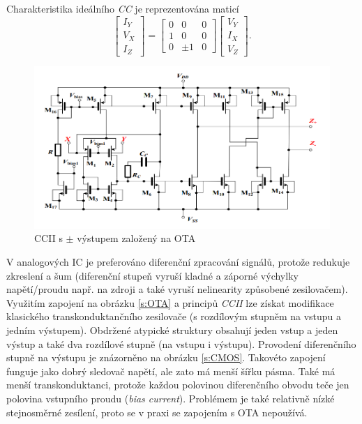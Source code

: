 Charakteristika ideálního \textit{CC} je reprezentována maticí
\begin{equation}
\begin{bmatrix}
I_Y \\ V_X \\ I_Z
\end{bmatrix}
=
\begin{bmatrix}
0 & 0 & 0 \\
1 & 0 & 0 \\
0 & \pm 1 & 0 
\end{bmatrix}
\begin{bmatrix}
V_Y \\
I_X \\
V_Z
\end{bmatrix}.
\end{equation}
\begin{figure}[h]
\centering
\includegraphics[scale=0.45]{cciiota.png}
\caption[CCII s $\pm$ výstupem založený na OTA]{CCII s $\pm$ výstupem založený na OTA \cite{8}}
\end{figure}
\newline
V analogových IC je preferováno diferenční zpracování signálů, protože redukuje zkreslení a šum (diferenční stupeň vyruší kladné a záporné výchylky napětí/proudu např. na zdroji a také vyruší nelinearity způsobené zesilovačem).\\
Využitím zapojení na obrázku \ref{s:OTA} a principů \textit{CCII} lze získat modifikace klasického transkonduktančního zesilovače (s rozdílovým stupněm na vstupu a jedním výstupem). Obdržené atypické struktury obsahují jeden vstup a jeden výstup a také dva rozdílové stupně (na vstupu i výstupu). Provodení diferenčního stupně na výstupu je znázorněno na obrázku \ref{s:CMOS}. Takovéto zapojení funguje jako dobrý sledovač napětí, ale zato má menší šířku pásma. Také má menší transkonduktanci, protože každou polovinou diferenčního obvodu teče jen polovina vstupního proudu (\textit{bias current}). Problémem je také relativně nízké stejnosměrné zesílení, proto se v praxi se zapojením s OTA nepoužívá. \\
